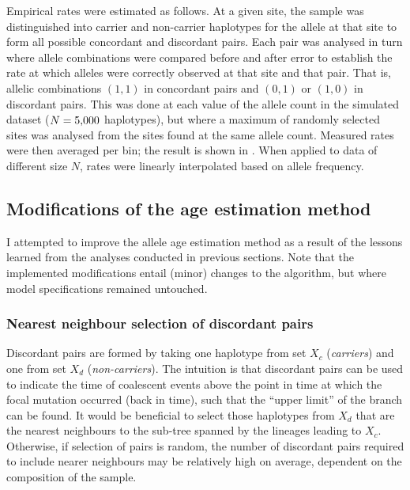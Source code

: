 Empirical rates were estimated as follows.
At a given site, the sample was distinguished into carrier and non-carrier haplotypes for the allele at that site to form all possible concordant and discordant pairs.
Each pair was analysed in turn where allele combinations were compared before and after error to establish the rate at which alleles were correctly observed at that site and that pair.
That is, allelic combinations $(1,1)$ in concordant pairs and $(0,1)$ or $(1,0)$ in discordant pairs.
This was done at each value of the allele count in the simulated dataset ($N=\n{5000}$ haplotypes), but where a maximum of  randomly selected sites was analysed from the sites found at the same allele count.
Measured rates were then averaged per bin; the result is shown in .
When applied to data of different size $N$, rates were linearly interpolated based on allele frequency.






%
\subsection{Modifications of the age estimation method}\label{sec:age_method_mod}
%

I attempted to improve the allele age estimation method as a result of the lessons learned from the analyses conducted in previous sections.
Note that the implemented modifications entail (minor) changes to the algorithm, but where model specifications remained untouched.

%
\subsubsection{Nearest neighbour selection of discordant pairs}
%

Discordant pairs are formed by taking one haplotype from set $X_c$ (\emph{carriers}) and one from set $X_d$ (\emph{non-carriers}).
The intuition is that discordant pairs can be used to indicate the time of coalescent events above the point in time at which the focal mutation occurred (back in time), such that the ``upper limit'' of the branch can be found.
It would be beneficial to select those haplotypes from $X_d$ that are the nearest neighbours to the sub-tree spanned by the lineages leading to $X_c$.
Otherwise, if selection of pairs is random, the number of discordant pairs required to include nearer neighbours may be relatively high on average, dependent on the composition of the sample.

